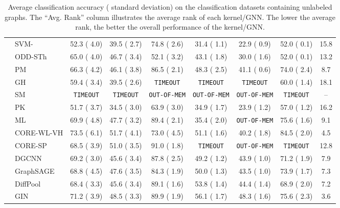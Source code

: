 \documentclass[twoside,11pt]{article}
\begin{document}
\begin{table}[t]
{\begin{tabular}{llccccccc}
& SVM- & 52.3 {\tiny ( 4.0)} & 39.5 {\tiny ( 2.7)} & 74.8 {\tiny ( 2.6)} & 31.4 {\tiny ( 1.1)} & 22.9 {\tiny ( 0.9)} & 52.0 {\tiny ( 0.1)} & 15.8 \\ 
& ODD-STh & 65.0 {\tiny ( 4.0)} & 46.7 {\tiny ( 3.4)} & 52.1 {\tiny ( 3.2)} & 43.1 {\tiny ( 1.8)} & 30.0 {\tiny ( 1.6)} & 52.0 {\tiny ( 0.1)} & 13.2 \\ 
& PM & 66.3 {\tiny ( 4.2)} & 46.1 {\tiny ( 3.8)} & 86.5 {\tiny ( 2.1)} & 48.3 {\tiny ( 2.5)} & 41.1 {\tiny ( 0.6)} & 74.0 {\tiny ( 2.4)} & 8.7 \\ 
& GH & 59.4 {\tiny ( 3.4)} & 39.5 {\tiny ( 2.6)} & \texttt{TIMEOUT} & \texttt{TIMEOUT} & \texttt{TIMEOUT} & 60.0 {\tiny ( 1.4)} & 18.1 \\ 
& SM & \texttt{TIMEOUT} & \texttt{TIMEOUT} & \texttt{OUT-OF-MEM} & \texttt{OUT-OF-MEM} & \texttt{OUT-OF-MEM} & \texttt{TIMEOUT} & -- \\ 
& PK & 51.7 {\tiny ( 3.7)} & 34.5 {\tiny ( 3.0)} & 63.9 {\tiny ( 3.0)} & 34.9 {\tiny ( 1.7)} & 23.9 {\tiny ( 1.2)} & 57.0 {\tiny ( 1.2)} & 16.2 \\ 
& ML & 69.9 {\tiny ( 4.8)} & 47.7 {\tiny ( 3.2)} & 89.4 {\tiny ( 2.1)} & 35.4 {\tiny ( 2.0)} & \texttt{OUT-OF-MEM} & 75.6 {\tiny ( 1.6)} & 9.1 \\ 
& CORE-WL-VH & 73.5 {\tiny ( 6.1)} & 51.7 {\tiny ( 4.1)} & 73.0 {\tiny ( 4.5)} & 51.1 {\tiny ( 1.6)} & 40.2 {\tiny ( 1.8)} & 84.5 {\tiny ( 2.0)} & 4.5 \\ 
& CORE-SP & 68.5 {\tiny ( 3.9)} & 51.0 {\tiny ( 3.5)} & 91.0 {\tiny ( 1.8)} & \texttt{TIMEOUT} & \texttt{OUT-OF-MEM} & \texttt{TIMEOUT} & 12.8 \\ 
\midrule
\parbox[t]{2mm}{} & DGCNN & 69.2 {\tiny ( 3.0)} & 45.6 {\tiny ( 3.4)} & 87.8 {\tiny ( 2.5)} & 49.2 {\tiny ( 1.2)} & 43.9 {\tiny ( 1.0)} & 71.2 {\tiny ( 1.9)} & 7.9 \\ 
& GraphSAGE & 68.8 {\tiny ( 4.5)} & 47.6 {\tiny ( 3.5)} & 84.3 {\tiny ( 1.9)} & 50.0 {\tiny ( 1.3)} & 43.5 {\tiny ( 1.0)} & 73.9 {\tiny ( 1.7)} & 7.3 \\ 
& DiffPool & 68.4 {\tiny ( 3.3)} & 45.6 {\tiny ( 3.4)} & 89.1 {\tiny ( 1.6)} & 53.8 {\tiny ( 1.4)} & 44.4 {\tiny ( 1.4)} & 68.9 {\tiny ( 2.0)} & 7.2 \\ 
& GIN & 71.2 {\tiny ( 3.9)} & 48.5 {\tiny ( 3.3)} & 89.9 {\tiny ( 1.9)} & 56.1 {\tiny ( 1.7)} & 48.3 {\tiny ( 1.6)} & 75.6 {\tiny ( 2.3)} & 3.6 \\ 
\bottomrule
\end{tabular}
}
\caption{Average classification accuracy ( standard deviation) on the  classification datasets containing unlabeled graphs. The ``Avg. Rank'' column illustrates the average rank of each kernel/GNN. The lower the average rank, the better the overall performance of the kernel/GNN.}
\label{tab:results_unlabeled}
\end{table}
\end{document}
